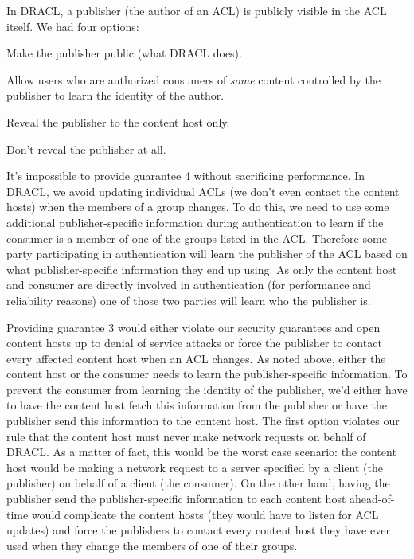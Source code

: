 \documentclass[pdftex,12pt,a4papaer]{report}
\begin{document}
In DRACL, a publisher (the author of an ACL) is publicly visible in the ACL
itself. We had four options:

\begin{compactenum}
\item Make the publisher public (what DRACL does).
\item Allow users who are authorized consumers of \emph{some} content controlled
  by the publisher to learn the identity of the author.
\item Reveal the publisher to the content host only.
\item Don't reveal the publisher at all.
\end{compactenum}

It's impossible to provide guarantee 4 without sacrificing performance. In
DRACL, we avoid updating individual ACLs (we don't even contact the content
hosts) when the members of a group changes. To do this, we need to use some
additional publisher-specific information during authentication to learn if the
consumer is a member of one of the groups listed in the ACL\@. Therefore some
party participating in authentication will learn the publisher of the ACL based on
what publisher-specific information they end up using. As only the content host and
consumer are directly involved in authentication (for performance and
reliability reasons) one of those two parties will learn who the publisher is.

Providing guarantee 3 would either violate our security guarantees and open
content hosts up to denial of service attacks or force the publisher to
contact every affected content host when an ACL changes. As noted above, either
the content host or the consumer needs to learn the publisher-specific information.
To prevent the consumer from learning the identity of the publisher, we'd either
have to have the content host fetch this information from the publisher or have the
publisher send this information to the content host. The first option violates our
rule that the content host must never make network requests on behalf of DRACL\@.
As a matter of fact, this would be the worst case scenario: the content host
would be making a network request to a server specified by a client (the publisher) on behalf of a client (the consumer). On the other hand, having the publisher
send the publisher-specific information to each content host ahead-of-time would
complicate the content hosts (they would have to listen for ACL updates) and
force the publishers to contact every content host they have ever used when
they change the members of one of their groups.
\end{document}
